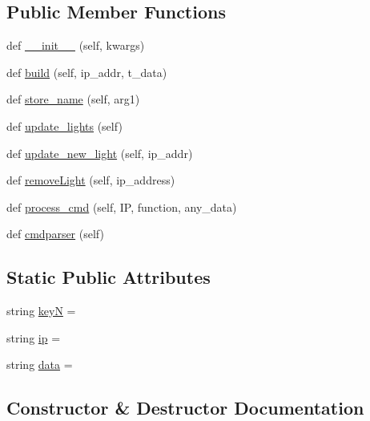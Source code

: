 \subsection*{Public Member Functions}
\begin{DoxyCompactItemize}
\item 
def \hyperlink{classGUI8J_1_1Methods_adc3fea247ec7f4ff14a89268ee621359}{\+\_\+\+\_\+init\+\_\+\+\_\+} (self, kwargs)
\item 
def \hyperlink{classGUI8J_1_1Methods_af96b0e255602c98879c512bddcaebed2}{build} (self, ip\+\_\+addr, t\+\_\+data)
\item 
def \hyperlink{classGUI8J_1_1Methods_ad0dd20d8d597befe81e356d418f47a65}{store\+\_\+name} (self, arg1)
\item 
def \hyperlink{classGUI8J_1_1Methods_ab9cf7acacb2eb61de67d4b24b702d7c8}{update\+\_\+lights} (self)
\item 
def \hyperlink{classGUI8J_1_1Methods_a037fe622e6ad36e48f3d5d4748968eda}{update\+\_\+new\+\_\+light} (self, ip\+\_\+addr)
\item 
def \hyperlink{classGUI8J_1_1Methods_aa82c91d2adbd53757d572a3504560441}{remove\+Light} (self, ip\+\_\+address)
\item 
def \hyperlink{classGUI8J_1_1Methods_a46a806bf76cd8a08b8c71a63bb954c37}{process\+\_\+cmd} (self, IP, function, any\+\_\+data)
\item 
def \hyperlink{classGUI8J_1_1Methods_a8f3190273093fe470288af2089fef4d6}{cmdparser} (self)
\end{DoxyCompactItemize}
\subsection*{Static Public Attributes}
\begin{DoxyCompactItemize}
\item 
string \hyperlink{classGUI8J_1_1Methods_a28bf2c3a7818a8c36f162990c504c861}{keyN} = \textquotesingle{}\textquotesingle{}
\item 
string \hyperlink{classGUI8J_1_1Methods_af8a350aa65fdbdc2a64b36b5e86dca74}{ip} = \textquotesingle{}\textquotesingle{}
\item 
string \hyperlink{classGUI8J_1_1Methods_aa16d5688c16569e965c5be18ba771a6f}{data} = \textquotesingle{}\textquotesingle{}
\end{DoxyCompactItemize}


\subsection{Constructor \& Destructor Documentation}
